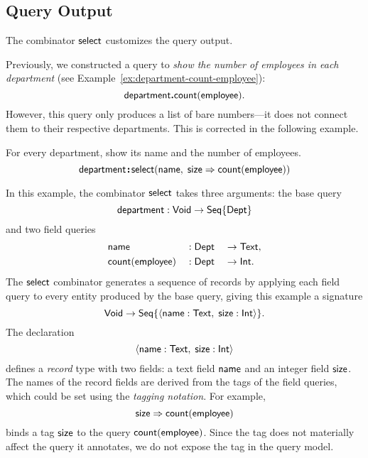 \subsection*{Query Output}

The combinator $\mathsf{select}$ customizes the query output.

Previously, we constructed a query to \emph{show the number of employees in
each department} (see Example~\ref{ex:department-count-employee}):
\begin{equation*}
    \mathsf{department}\boldsymbol{.}\mathsf{count}(\mathsf{employee}).
\end{equation*}
However, this query only produces a list of bare numbers---it does not connect
them to their respective departments.  This is corrected in the following example.

\begin{demo}
    \label{ex:department-select-name-size}
    For every department, show its name and the number of employees.
    \begin{equation*}
        \mathsf{department}
        \!\boldsymbol{:}\!\mathsf{select}(\mathsf{name},\;\mathsf{size}\Rightarrow\mathsf{count}(\mathsf{employee}))
    \end{equation*}
\end{demo}

In this example, the combinator $\mathsf{select}$ takes three arguments: the base query
\begin{equation*}
    \mathsf{department} : \mathsf{Void} \to \mathsf{Seq}{\left\{\mathsf{Dept}\right\}}
\end{equation*}
and two field queries
\begin{alignat*}{3}
    & \mathsf{name} && : \mathsf{Dept} && \to \mathsf{Text}, \\
    & \mathsf{count}(\mathsf{employee}) && : \mathsf{Dept} && \to \mathsf{Int}.
\end{alignat*}
The $\mathsf{select}$ combinator generates a sequence of records by applying each field
query to every entity produced by the base query, giving this example a
signature
\begin{equation*}
    \mathsf{Void} \to \mathsf{Seq}{\left\{\langle \mathsf{name}:\mathsf{Text},\; \mathsf{size}:\mathsf{Int} \rangle\right\}}.
\end{equation*}
The declaration
\begin{equation*}
    \langle \mathsf{name}:\mathsf{Text},\; \mathsf{size}:\mathsf{Int} \rangle
\end{equation*}
defines a \emph{record} type with two fields: a text field $\mathsf{name}$ and an
integer field $\mathsf{size}$.  The names of the record fields are derived from the
tags of the field queries, which could be set using the \emph{tagging
notation}.  For example,
\begin{equation*}
    \mathsf{size} \Rightarrow \mathsf{count}(\mathsf{employee})
\end{equation*}
binds a tag $\mathsf{size}$ to the query $\mathsf{count}(\mathsf{employee})$.  Since the tag does not
materially affect the query it annotates, we do not expose the tag in the query
model.


